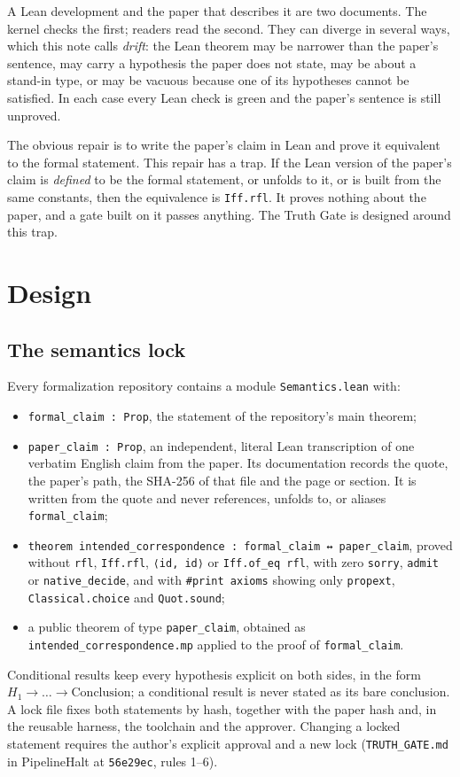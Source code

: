 \documentclass[11pt,a4paper]{article}
\newcommand{\code}[1]{\texttt{#1}}
\begin{document}
A Lean development and the paper that describes it are two documents. The kernel checks the
first; readers read the second. They can diverge in several ways, which this note calls
\emph{drift}: the Lean theorem may be narrower than the paper's sentence, may carry a
hypothesis the paper does not state, may be about a stand-in type, or may be vacuous because one
of its hypotheses cannot be satisfied. In each case every Lean check is green and the paper's
sentence is still unproved.

The obvious repair is to write the paper's claim in Lean and prove it equivalent to the formal
statement. This repair has a trap. If the Lean version of the paper's claim is \emph{defined}
to be the formal statement, or unfolds to it, or is built from the same constants, then the
equivalence is \code{Iff.rfl}. It proves nothing about the paper, and a gate built on it passes
anything. The Truth Gate is designed around this trap.

\section{Design}
\label{sec:design}

\subsection{The semantics lock}

Every formalization repository contains a module \code{Semantics.lean} with:
\begin{itemize}
\item \code{formal\_claim : Prop}, the statement of the repository's main theorem;
\item \code{paper\_claim : Prop}, an independent, literal Lean transcription of one verbatim
  English claim from the paper. Its documentation records the quote, the paper's path, the
  SHA-256 of that file and the page or section. It is written from the quote and never
  references, unfolds to, or aliases \code{formal\_claim};
\item \code{theorem intended\_correspondence : formal\_claim ↔ paper\_claim}, proved without
  \code{rfl}, \code{Iff.rfl}, \code{⟨id, id⟩} or \code{Iff.of\_eq rfl}, with zero
  \code{sorry}, \code{admit} or \code{native\_decide}, and with \code{\#print axioms} showing
  only \code{propext}, \code{Classical.choice} and \code{Quot.sound};
\item a public theorem of type \code{paper\_claim}, obtained as
  \code{intended\_correspondence.mp} applied to the proof of \code{formal\_claim}.
\end{itemize}
Conditional results keep every hypothesis explicit on both sides, in the form
$H_1\to\dots\to\text{Conclusion}$; a conditional result is never stated as its bare conclusion.
A lock file fixes both statements by hash, together with the paper hash and, in the reusable
harness, the toolchain and the approver. Changing a locked statement requires the author's
explicit approval and a new lock (\code{TRUTH\_GATE.md} in PipelineHalt at \code{56e29ec},
rules 1--6).
\end{document}
